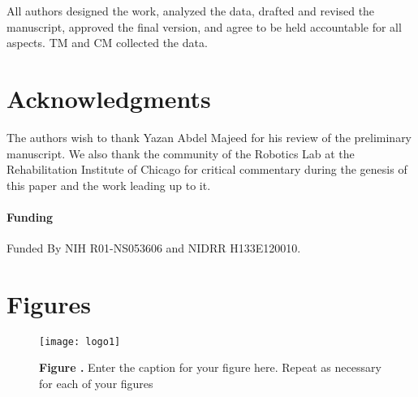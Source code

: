 \documentclass{frontiersSCNS} %
\begin{document}
All authors designed the work, analyzed the data, drafted and revised the manuscript, approved the final version, and agree to be held accountable for all aspects. TM and CM collected the data.

\section*{Acknowledgments}
The authors wish to thank Yazan Abdel Majeed for his review of the preliminary manuscript. We also thank the community  of the Robotics Lab at the Rehabilitation Institute of Chicago for critical commentary during the genesis of this paper and the work leading up to it.


\paragraph{Funding\textcolon} Funded By NIH R01-NS053606 and NIDRR H133E120010.





\section*{Figures}


\begin{figure}[h!]
\begin{center}
\texttt{[image: logo1]}%
\end{center}
 \textbf{\label{fig:01} Figure .}{ Enter the caption for your figure here.  Repeat as  necessary for each of your figures }
\end{figure}
\end{document}
